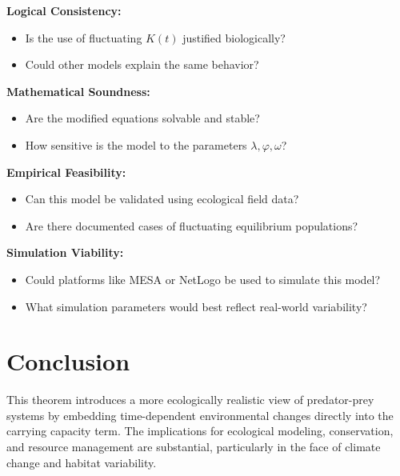 \documentclass[12pt]{article}
\begin{document}
\textbf{Logical Consistency:}
\begin{itemize}
  \item Is the use of fluctuating \( K(t) \) justified biologically?
  \item Could other models explain the same behavior?
\end{itemize}

\textbf{Mathematical Soundness:}
\begin{itemize}
  \item Are the modified equations solvable and stable?
  \item How sensitive is the model to the parameters \( \lambda, \varphi, \omega \)?
\end{itemize}

\textbf{Empirical Feasibility:}
\begin{itemize}
  \item Can this model be validated using ecological field data?
  \item Are there documented cases of fluctuating equilibrium populations?
\end{itemize}

\textbf{Simulation Viability:}
\begin{itemize}
  \item Could platforms like MESA or NetLogo be used to simulate this model?
  \item What simulation parameters would best reflect real-world variability?
\end{itemize}

\section*{Conclusion}

This theorem introduces a more ecologically realistic view of predator-prey systems by embedding time-dependent environmental changes directly into the carrying capacity term. The implications for ecological modeling, conservation, and resource management are substantial, particularly in the face of climate change and habitat variability.
\end{document}
